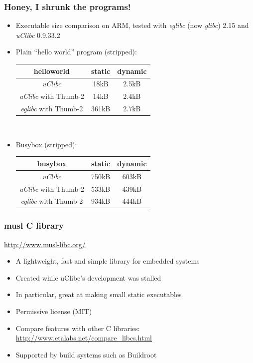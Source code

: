 \begin{frame}
  \frametitle{Honey, I shrunk the programs!}
  \begin{itemize}
  \item Executable size comparison on ARM, tested with {\em eglibc}
  (now {\em glibc})
  2.15 and {\em uClibc} 0.9.33.2
  \item Plain ``hello world'' program (stripped): \\
    \begin{tabular}{| c || c | c |} \hline
    helloworld & static & dynamic \\ \hline
    {\em uClibc} & 18kB & 2.5kB \\
    {\em uClibc} with Thumb-2 & 14kB & 2.4kB \\
    {\em eglibc} with Thumb-2 & 361kB & 2.7kB \\ \hline
    \end{tabular} \\
  \item Busybox (stripped): \\
    \begin{tabular}{| c || c | c |} \hline
    busybox & static & dynamic \\ \hline
    {\em uClibc} & 750kB & 603kB \\
    {\em uClibc} with Thumb-2 & 533kB & 439kB \\
    {\em eglibc} with Thumb-2 & 934kB & 444kB \\ \hline
    \end{tabular}
  \end{itemize}
\end{frame}

\begin{frame}
  \frametitle{musl C library}
  \url{http://www.musl-libc.org/}
  \begin{itemize}
  \item A lightweight, fast and simple library for embedded systems
  \item Created while uClibc's development was stalled
  \item In particular, great at making small static executables
  \item Permissive license (MIT)
  \item Compare features with other C libraries:
    \url{http://www.etalabs.net/compare_libcs.html}
  \item Supported by build systems such as Buildroot
  \end{itemize}
\end{frame}

